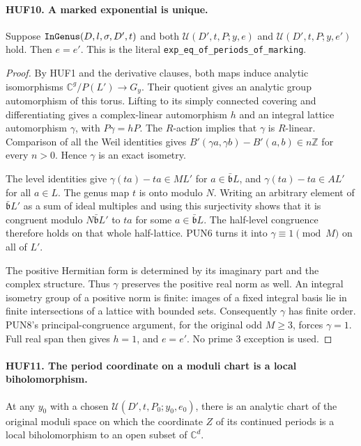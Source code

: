 \documentclass[11pt,a4paper]{article}
\numberwithin{equation}{section}
\theoremstyle{remark}\newtheorem{remark}[theorem]{Remark}
\begin{document}
\paragraph{HUF10. A marked exponential is unique.}
\label{claim:HUF10}
Suppose \(\texttt{In\allowbreak Genus}(D,l,\sigma,D',t)\) and
both \(\mathcal U(D',t,P;y,e)\) and
\(\mathcal U(D',t,P;y,e')\) hold.  Then \(e=e'\).
This is the literal \texttt{exp\_\allowbreak eq\_\allowbreak of\_\allowbreak periods\_\allowbreak of\_\allowbreak marking}.

\begin{proof}
By HUF1 and the derivative clauses, both maps induce
analytic isomorphisms \(\mathbb C^g/P(L')\to G_y\).
Their quotient gives an analytic group automorphism
of this torus.  Lifting to its simply connected
covering and differentiating gives a complex-linear
automorphism \(h\) and an integral lattice
automorphism \(\gamma\), with \(P\gamma=hP\).
The \(R\)-action implies that \(\gamma\) is \(R\)-linear.
Comparison of all the Weil identities gives
\(B'(\gamma a,\gamma b)-B'(a,b)\in n\mathbb Z\)
for every \(n>0\).  Hence \(\gamma\) is an exact
isometry.

The level identities give
\(\gamma(ta)-ta\in ML'\) for
\(a\in\bar{\mathfrak b}L\), and
\(\gamma(ta)-ta\in AL'\) for all \(a\in L\).
The genus map \(t\) is onto modulo \(N\).
Writing an arbitrary element of
\(\bar{\mathfrak b}L'\) as a sum of ideal multiples
and using this surjectivity shows that it is congruent
modulo \(N\bar{\mathfrak b}L'\) to \(ta\) for
some \(a\in\bar{\mathfrak b}L\).  The half-level
congruence therefore holds on that whole half-lattice.
PUN6 turns it into \(\gamma\equiv1\pmod M\)
on all of \(L'\).

The positive Hermitian form is determined by its
imaginary part and the complex structure.  Thus
\(\gamma\) preserves the positive real norm as well.
An integral isometry group of a positive norm is
finite: images of a fixed integral basis lie in
finite intersections of a lattice with bounded
sets.  Consequently \(\gamma\) has finite order.
PUN8's principal-congruence argument, for the
original odd \(M\geq3\), forces \(\gamma=1\).
Full real span then gives \(h=1\), and \(e=e'\).
No prime \(3\) exception is used.
\end{proof}

\paragraph{HUF11. The period coordinate on a moduli chart is a local biholomorphism.}
\label{claim:HUF11}
At any \(y_0\) with a chosen \(\mathcal U(D',t,P_0;y_0,e_0)\),
there is an analytic chart of the original moduli space
on which the coordinate \(Z\) of its continued periods
is a local biholomorphism to an open subset of
\(\mathbb C^d\).
\end{document}
